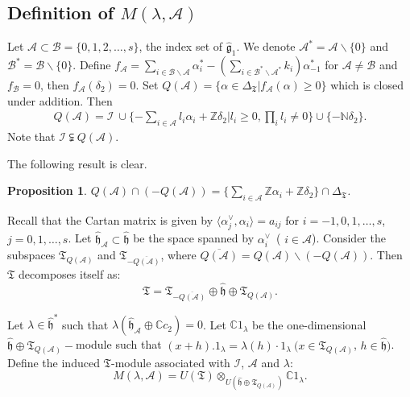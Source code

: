 \documentclass[11pt]{amsproc}
\newtheorem{proposition}{Proposition}[section]
\theoremstyle{definition}
\theoremstyle{remark}
\numberwithin{equation}{section} \errorcontextlines=0
\begin{document}
\subsection{Definition of $M(\lambda,\mathcal {A})$}
Let $\mathcal {A}\subset \mathcal {B}=\{0,1,2,\ldots,s\}$,
the index set of $\hat{\mathfrak g}_1$. We denote $\mathcal
{A}^{\ast}=\mathcal {A}\backslash \{0\}$ and $\mathcal
{B}^{\ast}=\mathcal {B}\backslash \{0\}$. Define $f_{\mathcal
{A}}=\sum\limits_{i\in \mathcal {B}\backslash \mathcal {A}}
\alpha_i^{\ast}-(\sum\limits_{i\in \mathcal {B}^{\ast}\backslash
\mathcal {A}^{\ast}}k_i)\alpha_{-1}^{\ast}$ for $\mathcal {A}\neq
\mathcal {B}$ and $f_{\mathcal {B}}=0$, then $f_{\mathcal
{A}}(\delta_2)=0$. Set $Q(\mathcal
{A})=\{\alpha\in\Delta_{\mathfrak T}|f_{\mathcal
{A}}(\alpha)\geq 0\}$ which is closed under addition. Then
\begin{align*}
Q(\mathcal {A})=\mathcal {I}\ \cup\{-\sum \limits_{i\in \mathcal
{A}}l_i\alpha_i+\mathbb{Z}\delta_2|l_i\geq 0, \prod_il_i\neq 0\}\cup\{-\mathbb{N}\delta_2\}.
\end{align*}
Note that $\mathcal
{I}\subsetneqq Q(\mathcal {A}).$

The following result is clear.
\begin{proposition}
$Q(\mathcal {A})\cap(-Q(\mathcal {A}))=\{\sum\limits_{i\in \mathcal
{A}}\mathbb{Z}\alpha_i+\mathbb{Z}\delta_2\}\cap\Delta_{\mathfrak T}$.
\end{proposition}

Recall that the Cartan matrix is given by $\langle \alpha_j^{\vee}, \alpha_i\rangle=a_{ij}$  for
$i=-1,0,1,\ldots,s$, $j=0,1,\ldots,s$. Let
$\hat{\mathfrak h}_{\mathcal {A}}\subset\hat{\mathfrak h}$ be the space spanned by
$\alpha_i^{\vee}$~( $i\in \mathcal {A}$). Consider the subspaces
$\mathfrak T_{Q(\mathcal {A})}$ and
$\mathfrak T_{-\overline{Q(\mathcal {A})}}$, where
$\overline{Q(\mathcal {A})}=Q(\mathcal {A})\backslash (-Q(\mathcal
{A}))$. Then $\mathfrak T$ decomposes itself as:
$$\mathfrak T=\mathfrak T_{-\overline{Q(\mathcal {A})}}\oplus\hat{\mathfrak h}\oplus \mathfrak T_{Q(\mathcal
{A})}.$$

Let $\lambda\in\hat{\mathfrak h}^{\ast}$ such that ${\lambda}(\hat{\mathfrak h}_{\mathcal
{A}}\oplus\mathbb{C}c_2)=0$. Let $\mathbb C1_{\lambda}$ be the one-dimensional
$\hat{\mathfrak h}\oplus \mathfrak T_{Q(\mathcal {A})}-$module such that
$(x+h).1_{\lambda}=\lambda(h)\cdot 1_{\lambda}~(x\in
\mathfrak T_{Q(\mathcal {A})}$, $h\in\hat{\mathfrak h})$. Define the
induced $\mathfrak T$-module associated with $\mathcal {I}$, $\mathcal
{A}$ and $\lambda$:
$$M(\lambda,\mathcal {A})=U(\mathfrak T)\otimes_{U(\hat{\mathfrak h}\oplus \mathfrak T_{Q(\mathcal {A})}
)}\mathbb C1_{\lambda}.$$
\end{document}
